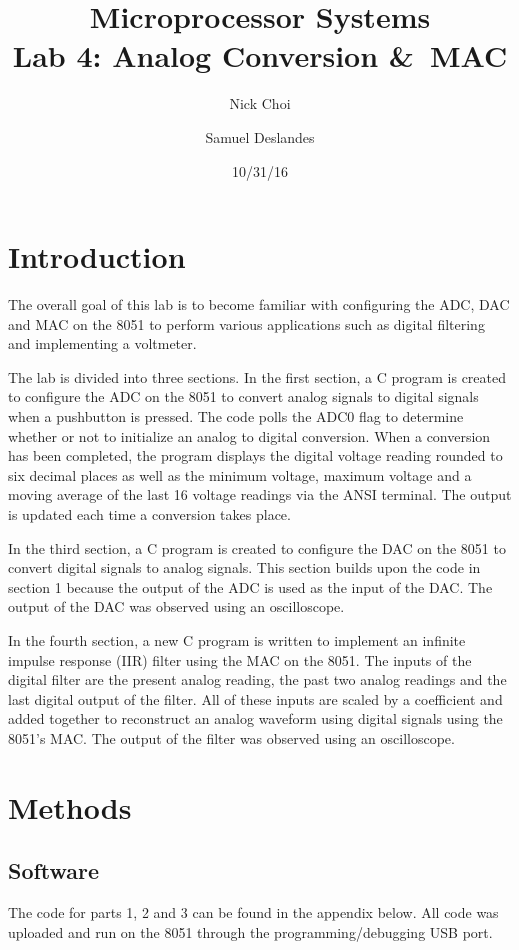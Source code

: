 \documentclass[12pt]{article}
\begin{document}
\title{Microprocessor Systems\\ Lab 4: Analog Conversion \&\ MAC }
\author{Nick Choi \and Samuel Deslandes}
\date{10/31/16}
\maketitle
\pagebreak
\section{Introduction}

The overall goal of this lab is to become familiar with configuring the ADC, DAC and MAC on the 8051 to perform various applications such as digital filtering and implementing a voltmeter. 

The lab is divided into three sections. In the first section, a C program is created to configure the ADC on the 8051 to convert analog signals to digital signals when a pushbutton is pressed. The code polls the ADC0 flag to determine whether or not to initialize an analog to digital conversion. When a conversion has been completed, the program displays the digital voltage reading rounded to six decimal places as well as the minimum voltage, maximum voltage and a moving average of the last 16 voltage readings via the ANSI terminal. The output is updated each time a conversion takes place. 

In the third section, a C program is created to configure the DAC on the 8051 to convert digital signals to analog signals. This section builds upon the code in section 1 because the output of the ADC is used as the input of the DAC. The output of the DAC was observed using an oscilloscope. 

In the fourth section, a new C program is written to implement an infinite impulse response (IIR) filter using the MAC on the 8051. The inputs of the digital filter are the present analog reading, the past two analog readings and the last digital output of the filter. All of these inputs are scaled by a coefficient and added together to reconstruct an analog waveform using digital signals using the 8051’s MAC. The output of the filter was observed using an oscilloscope. 

\section{Methods}
\subsection{Software}
The code for parts 1, 2 and 3 can be found in the appendix below. All code was uploaded and run on the 8051 through the programming/debugging USB port. 
\end{document}
